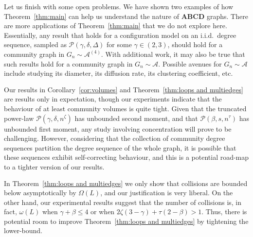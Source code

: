 \documentclass[12pt]{article}
\theoremstyle{definition}
\theoremstyle{remark}
\theoremstyle{remark}
\numberwithin{theorem}{section}
\newcommand{\abcdDist}{\ensuremath{\mathcal{A}}}
\newcommand{\abcdFour}{\ensuremath{\mathcal{A}^{(4)}}}
\newcommand{\tpl}[3]{\ensuremath{\mathcal{P}\left(#1,#2,#3\right)}}
\begin{document}

\bigskip

Let us finish with some open problems. We have shown two examples of how Theorem~\ref{thm:main} can help us understand the nature of \textbf{ABCD} graphs. There are more applications of Theorem~\ref{thm:main} that we do not explore here. Essentially, any result that holds for a configuration model on an i.i.d.\ degree sequence, sampled as $\tpl{\gamma}{\delta}{\Delta}$ for some $\gamma \in (2,3)$, should hold for a community graph in $G_n \sim \abcdFour$. With additional work, it may also be true that such results hold for a community graph in $G_n \sim \abcdDist$. Possible avenues for $G_n \sim \abcdDist$ include studying its diameter, its diffusion rate, its clustering coefficient, etc.

\bigskip

Our results in Corollary~\ref{cor:volumes} and Theorem~\ref{thm:loops and multiedges} are results only in expectation, though our experiments indicate that the behaviour of at least community volumes is quite tight. Given that the truncated power-law $\tpl{\gamma}{\delta}{n^\zeta}$ has unbounded second moment, and that $\tpl{\beta}{s}{n^\tau}$ has unbounded first moment, any study involving concentration will prove to be challenging. However, considering that the collection of community degree sequences partition the degree sequence of the whole graph, it is possible that these sequences exhibit self-correcting behaviour, and this is a potential road-map to a tighter version of our results. 

\bigskip

In Theorem~\ref{thm:loops and multiedges} we only show that collisions are bounded below asymptotically by $\Omega(L)$, and our justification is very liberal. On the other hand, our experimental results suggest that the number of collisions is, in fact, $\omega(L)$ when $\gamma + \beta \leq 4$ or when $2\zeta(3-\gamma) + \tau(2-\beta) > 1$. Thus, there is potential room to improve Theorem~\ref{thm:loops and multiedges} by tightening the lower-bound. 

% 

\end{document}
